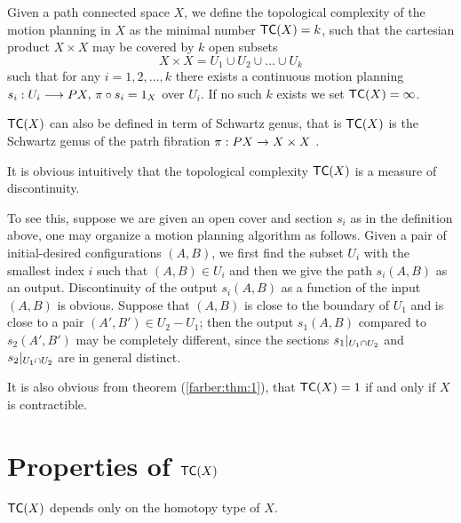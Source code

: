 \begin{defn}
    Given a path connected space $X$, we define the topological complexity of the motion planning in $X$ as the minimal number $\textsf{TC}(X) = k$, such that the cartesian product $X \times X$ may be covered by $k$ open subsets
    \[
        X \times X  = U_1 \cup U_2 \cup \dots \cup U_k
    \]
    such that for any $i = 1,2, \ldots, k$ there exists a continuous motion planning $s_i: U_i \longrightarrow PX, \, \pi \circ s_i = 1_X$ over $U_i$. If no such $k$ exists we set $\textsf{TC}(X) = \infty$.
\end{defn}

\begin{rem}
    $\textsf{TC}(X)$ can also be defined in term of Schwartz genus, that is $\textsf{TC}(X)$ is the Schwartz genus of the patrh fibration $\pi : PX \rightarrow X \times X$ \cite{farber2007symmetric}.

    It is obvious intuitively that the topological complexity $\textsf{TC}(X)$ is a measure of discontinuity.

    To see this, suppose we are given an open cover and section $s_i$ as in the definition above, one may organize a motion planning algorithm as follows. Given a pair of initial-desired configurations
    $(A, B)$, we first find the subset $U_i$ with the smallest index $i$ such that $(A,B) \in U_i$ and then we give the path $s_i(A,B)$ as an output. Discontinuity of the output $s_i(A,B)$ as a function of the input $(A,B)$ is obvious. 
    Suppose that $(A,B)$ is close to the boundary of $U_1$ and is close to a pair $(A', B') \in U_2 - U_1$; then the output $s_1(A,B)$ compared to $s_2(A',B')$ may be completely different, since the sections $\displaystyle s_1|_{U_1 \cap U_2}$ and $\displaystyle s_2|_{U_1 \cap U_2}$ are in general distinct.

    It is also obvious from theorem (\ref{farber:thm:1}), that $\textsf{TC}(X) = 1$ if and only if $X$ is contractible.
\end{rem}

\section{Properties of $\textsf{TC}(X)$}\label{sec:}

\begin{thm}\label{homtopy:invariance}
    $\textsf{TC}(X)$ depends only on the homotopy type of $X$.
\end{thm}

